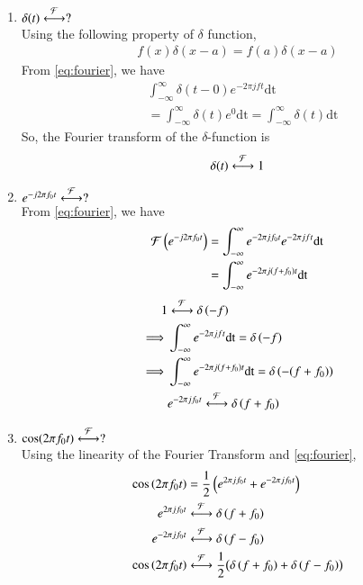 \documentclass[journal,12pt,twocolumn]{IEEEtran}
\renewcommand\thesection{\arabic{section}}
\begin{document}
\begin{enumerate}[label=\thesection.\arabic*
,ref=\thesection.\theenumi]
\item $\delta(t)\overset{\mathcal{F}}{ \longleftrightarrow}?$ \\
\solution
Using the following property of $\delta$ function, 
\begin{align}
	f(x) \delta(x - a) = f(a) \delta(x-a)
\end{align}
From \eqref{eq:fourier}, we have 
\begin{align}
	&\int_{-\infty}^{\infty} \delta(t - 0) e^{-2 \pi jft} \text{dt} \\
	&= \int_{-\infty}^{\infty} \delta(t) e^{0} \text{dt} = \int_{-\infty}^{\infty} \delta(t) \text{dt} 
\end{align}
So, the Fourier transform of the $\delta$-function is 
\begin{equation}
	\delta(t) \overset{\mathcal{F}}{ \longleftrightarrow} 1
\end{equation}


\item $e^{-j2\pi f_0t}\overset{\mathcal{F}}{ \longleftrightarrow}?$ \\
\solution
From \eqref{eq:fourier}, we have 
\begin{align}
	\mathcal{F}\left(e^{-j2\pi f_0t}\right)&=\int_{-\infty}^{\infty} e^{-2 \pi j f_0 t} e^{-2 \pi jft} \text{dt}\\
	&=\int_{-\infty}^{\infty} e^{-2 \pi j \left(f + f_0\right) t} \text{dt}
\end{align}
\begin{align}
	1 &\overset{\mathcal{F}}{ \longleftrightarrow} \delta\left(-f\right) \\
	\implies &\int_{-\infty}^{\infty} e^{-2 \pi jft} \text{dt} = \delta\left(-f\right) \\
	\implies &\int_{-\infty}^{\infty} e^{-2 \pi j\left(f + f_0\right) t} \text{dt} = \delta\left(-(f + f_0)\right) \\
		 &e^{-2 \pi j f_0 t} \overset{\mathcal{F}}{ \longleftrightarrow} \delta\left(f + f_0\right)
\end{align}


\item $\cos(2\pi f_0t)\overset{\mathcal{F}}{ \longleftrightarrow}?$ \\
\solution Using the linearity of the Fourier 
Transform and \eqref{eq:fourier},
\begin{align}
	\cos\left(2\pi f_0t\right) &= \frac{1}{2} \left(e^{2\pi j f_0t} + e^{-2\pi j f_0t}\right) \\
	e^{2 \pi j f_0 t} &\overset{\mathcal{F}}{ \longleftrightarrow}\delta\left(f+f_0\right) \\
	e^{-2 \pi j f_0 t} &\overset{\mathcal{F}}{ \longleftrightarrow}\delta\left(f-f_0\right) \\
	\cos\left(2 \pi f_0t\right) &\overset{\mathcal{F}}{ \longleftrightarrow}\frac{1}{2} \bigl(\delta\left(f + f_0\right) + \delta\left(f - f_0\right)\bigr)
\end{align}



\end{enumerate}
\end{document}
